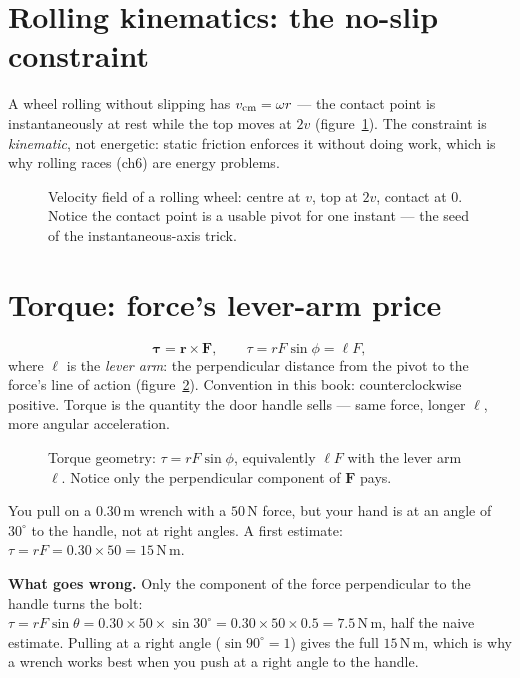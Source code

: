 \section{Rolling kinematics: the no-slip constraint}\label{sec:rot-noslip}

A wheel rolling without slipping has $v_{\rm cm}=\omega r$ --- the contact
point is instantaneously at rest while the top moves at $2v$
(figure~\ref{fig:rolling}). The constraint is \emph{kinematic}, not
energetic: static friction enforces it without doing work, which is why
rolling races (ch6) are energy problems.

\begin{figure}[htbp]\centering

\caption{Velocity field of a rolling wheel: centre at $v$, top at $2v$,
contact at $0$. Notice the contact point is a usable pivot for one
instant --- the seed of the instantaneous-axis trick.}
\label{fig:rolling}
\end{figure}

\section{Torque: force's lever-arm price}\label{sec:rot-torque}

\begin{equation}
  \boldsymbol\tau=\mathbf r\times\mathbf F,\qquad
  \tau=rF\sin\phi=\ell F,\label{eq:tau}
\end{equation}
where $\ell$ is the \emph{lever arm}: the perpendicular
distance from the pivot to the force's line of action
(figure~\ref{fig:torque}). Convention in this book: counterclockwise
positive. Torque is the quantity the door handle sells --- same force,
longer $\ell$, more angular acceleration.

\begin{figure}[htbp]\centering

\caption{Torque geometry: $\tau=rF\sin\phi$, equivalently $\ell F$ with the
lever arm $\ell$. Notice only the perpendicular component of $\mathbf F$
pays.}
\label{fig:torque}
\end{figure}

\begin{example}\label{ex:naive-wrench}
You pull on a $0.30\,\mathrm{m}$ wrench with a $50\,\mathrm{N}$ force, but your hand is at an angle of $30^\circ$ to the
handle, not at right angles. A first estimate: $\tau=rF=0.30\times50=15\,\mathrm{N\,m}$.
\par\smallskip
\textbf{What goes wrong.} Only the component of the force perpendicular to the handle turns the bolt:
$\tau=rF\sin\theta=0.30\times50\times\sin30^\circ=0.30\times50\times0.5=7.5\,\mathrm{N\,m}$, half the naive
estimate. Pulling at a right angle ($\sin90^\circ=1$) gives the full $15\,\mathrm{N\,m}$, which is why a wrench works best
when you push at a right angle to the handle.
\end{example}

